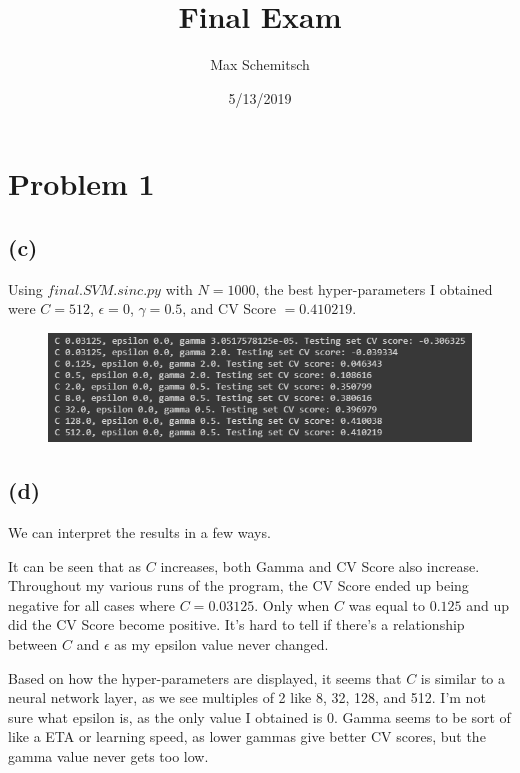 \documentclass[a4paper]{article}
\title{Final Exam}
\author{Max Schemitsch}
\date{5/13/2019}
\begin{document}
\lstset{language=Python}

\maketitle

\section{Problem 1}
\subsection{(c)}
Using $final.SVM.sinc.py$ with $N=1000$, the best hyper-parameters I obtained were $C=512$, $\epsilon = 0$, $\gamma = 0.5$, and CV Score $= 0.410219$.


\begin{figure}[h]
  \begin{center}
    \includegraphics[width=150mm,scale=1]{problem1c.png}
  \end{center}
\end{figure}


\subsection{(d)}
We can interpret the results in a few ways.


It can be seen that as $C$ increases, both Gamma and CV Score also increase. Throughout my various runs of the program, the CV Score ended up being negative for all cases where $C=0.03125$. Only when $C$ was equal to $0.125$ and up did the CV Score become positive. It's hard to tell if there's a relationship between $C$ and $\epsilon$ as my epsilon value never changed.


Based on how the hyper-parameters are displayed, it seems that $C$ is similar to a neural network layer, as we see multiples of 2 like 8, 32, 128, and 512. I'm not sure what epsilon is, as the only value I obtained is 0. Gamma seems to be sort of like a ETA or learning speed, as lower gammas give better CV scores, but the gamma value never gets too low.
\newpage
\end{document}
